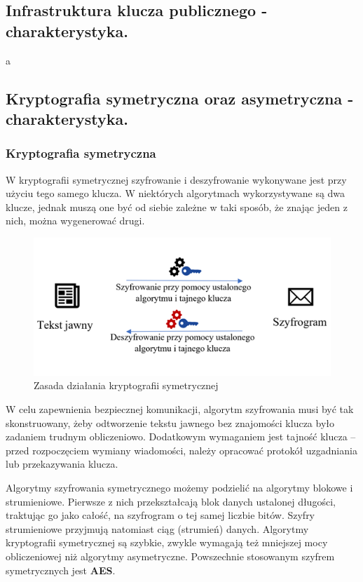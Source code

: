 \documentclass[a4paper,12pt,oneside]{book}
\begin{document}
			\subsection{\color{red}Infrastruktura klucza publicznego - charakterystyka.}
				a
			
			\newpage\subsection{Kryptografia symetryczna oraz asymetryczna - charakterystyka.}
				
				\subsubsection*{Kryptografia symetryczna}
				
				W kryptografii symetrycznej szyfrowanie i deszyfrowanie wykonywane jest przy użyciu tego samego klucza. W niektórych algorytmach wykorzystywane są dwa klucze, jednak muszą one być od siebie zależne w taki sposób, że znając jeden z nich, można wygenerować drugi.
				
				\begin{figure}[h!]
					\centering\includegraphics[scale=0.45]{krypt_sym.png}
					\caption{Zasada działania kryptografii symetrycznej}
				\end{figure}
				
				W celu zapewnienia bezpiecznej komunikacji, algorytm szyfrowania musi być tak skonstruowany, żeby odtworzenie tekstu jawnego bez znajomości klucza było zadaniem trudnym obliczeniowo. Dodatkowym wymaganiem jest tajność klucza – przed rozpoczęciem wymiany wiadomości, należy opracować protokół uzgadniania lub przekazywania klucza.
				
				Algorytmy szyfrowania symetrycznego możemy podzielić na algorytmy blokowe i strumieniowe. Pierwsze z nich przekształcają blok danych ustalonej długości, traktując go jako całość, na szyfrogram o tej samej liczbie bitów. Szyfry strumieniowe przyjmują natomiast ciąg (strumień) danych. Algorytmy kryptografii symetrycznej są szybkie, zwykle wymagają też mniejszej mocy obliczeniowej niż algorytmy asymetryczne. Powszechnie stosowanym szyfrem symetrycznych jest \textbf{AES}.
				
\end{document}
